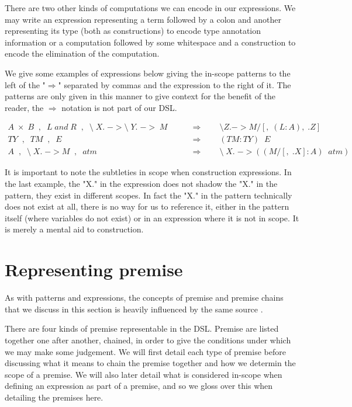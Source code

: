 There are two other kinds of computations we can encode in our
expressions. We may write an expression representing a term followed
by a colon and another representing its type (both as constructions)
to encode type annotation information or a computation followed by
some whitespace and a construction to encode the elimination of the
computation. 

We give some examples of expressions below giving the in-scope patterns
to the left of the "$\Rightarrow$" separated by commas and the
expression to the right of it. The patterns are only given in this
manner to give context for the benefit of the reader, the
$\Rightarrow$ notation is not part of our DSL.

\begin{align*}
  A \; \times \; B \;\; , \;\; L \; and \; R  \;\; , \;\; \mbox{\textbackslash} \;
  X. \; -> \mbox{\textbackslash} \; Y. \; -> \; M \qquad &\Rightarrow
  \qquad \mbox{\textbackslash} Z. -> M/[,\; (L:A),\; .Z]\\
  TY \;\; , \;\; TM \;\; , \;\; E \qquad &\Rightarrow \qquad
  (TM:TY)\;\; E\\
  A \;\; , \;\; \mbox{\textbackslash} \; X. \; -> M \;\; ,\;\; atm \qquad
  &\Rightarrow \qquad \mbox{\textbackslash} \; X. \; -> ((M/[,\; .X] : A)\;\; atm)
\end{align*}

It is important to note the subtleties in scope when construction
expressions. In the last example, the "X." in the expression does not
shadow the "X." in the pattern, they exist in different scopes. In
fact the "X." in the pattern technically does not exist at all, there
is no way for us to reference it, either in the pattern itself (where
variables do not exist) or in an expression where it is not in
scope. It is merely a mental aid to construction.

\section{Representing premise}

As with patterns and expressions, the concepts of premise and premise
chains that we discuss in this section is heavily influenced by the
same source \cite{TypesWhoSayNi}.

There are four kinds of premise representable in the DSL. Premise are
listed together one after another, chained, in order to give the
conditions under which we may make some judgement. We will first
detail each type of premise before discussing what it means to chain
the premise together and how we determin the scope of a premise. We
will also later detail what is considered in-scope when defining an
expression as part of a premise, and so we gloss over this when
detailing the premises here.

